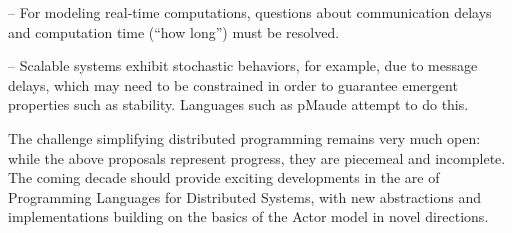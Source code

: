 -- For modeling real-time computations, questions about communication
delays and computation time (``how long'') must be resolved.

-- Scalable systems exhibit stochastic behaviors, for example, due to
message delays, which may need to be constrained in order to guarantee
emergent properties such as stability.  Languages such as pMaude
attempt to do this.

The challenge simplifying distributed programming remains very much
open: while the above proposals represent progress, they are piecemeal
and incomplete.  The coming decade should provide exciting
developments in the are of Programming Languages for Distributed
Systems, with new abstractions and implementations building on the
basics of the Actor model in novel directions.
